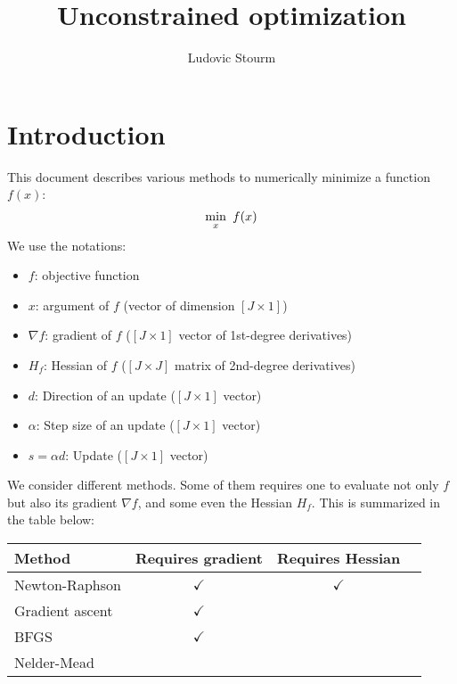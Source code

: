 \documentclass[12pt]{article}
\title{Unconstrained optimization}
\author{Ludovic Stourm}
\begin{document}
\maketitle

\section{Introduction}
This document describes various methods to numerically minimize a function $f(x)$:
\begin{equation}
	\underset{x}{\min} \hspace*{5pt} f(x)
\end{equation}
We use the notations:
\begin{itemize}
	\item $f$: objective function
	\item $x$: argument of $f$ (vector of dimension $[J \times 1]$)
	\item $\nabla f$: gradient of $f$ ($[J \times 1]$ vector of 1st-degree derivatives)
	\item $H_f$: Hessian of $f$ ($[J \times J]$ matrix of 2nd-degree derivatives)
	\item $d$: Direction of an update ($[J \times 1]$ vector)
	\item $\alpha$: Step size of an update ($[J \times 1]$ vector)
	\item $s = \alpha d$: Update ($[J \times 1]$ vector)
\end{itemize}
\vspace*{15pt}
We consider different methods. Some of them requires one to evaluate not only $f$ but also its gradient $\nabla f$, and some even the Hessian $H_f$. This is summarized in the table below:
\begin{center}
\begin{tabular}{|l|c|c|c}
	\hline
	Method & Requires gradient & Requires Hessian  \\ \hline
	Newton-Raphson		& $\checkmark$  & $\checkmark$   \\
	Gradient ascent		& $\checkmark$  &  \\
	BFGS				& $\checkmark$  &  \\
	Nelder-Mead			&   &  \\
	\hline
\end{tabular}
\end{center}
\end{document}
